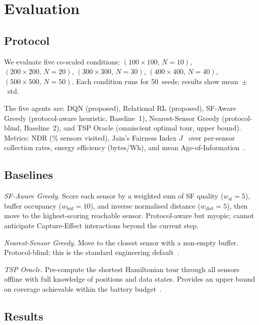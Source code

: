 \documentclass[conference]{IEEEtran}
\begin{document}
\section{Evaluation}

\subsection{Protocol}

We evaluate five co-scaled conditions: $(100{\times}100,\,N{=}10)$, $(200{\times}200,\,N{=}20)$, $(300{\times}300,\,N{=}30)$, $(400{\times}400,\,N{=}40)$, $(500{\times}500,\,N{=}50)$. Each condition runs for 50~seeds; results show mean~$\pm$~std.

The five agents are: DQN (proposed), Relational RL (proposed), SF-Aware Greedy (protocol-aware heuristic, Baseline~1), Nearest-Sensor Greedy (protocol-blind, Baseline~2), and TSP Oracle (omniscient optimal tour, upper bound). Metrics: NDR (\% sensors visited), Jain's Fairness Index $J$~\cite{jain1984quantitative} over per-sensor collection rates, energy efficiency (bytes/Wh), and mean Age-of-Information~\cite{kaul2012realtime,abdelmagid2019aoi,tripathi2022aoi}.

\subsection{Baselines}

\textit{SF-Aware Greedy.} Score each sensor by a weighted sum of SF quality ($w_{\text{sf}}{=}5$), buffer occupancy ($w_{\text{buf}}{=}10$), and inverse normalised distance ($w_{\text{dist}}{=}5$), then move to the highest-scoring reachable sensor. Protocol-aware but myopic; cannot anticipate Capture-Effect interactions beyond the current step.

\textit{Nearest-Sensor Greedy.} Move to the closest sensor with a non-empty buffer. Protocol-blind; this is the standard engineering default~\cite{lin1973tsp}.

\textit{TSP Oracle.} Pre-compute the shortest Hamiltonian tour through all sensors offline with full knowledge of positions and data states. Provides an upper bound on coverage achievable within the battery budget~\cite{kool2019attention,lin1973tsp}.

\subsection{Results}
\end{document}
